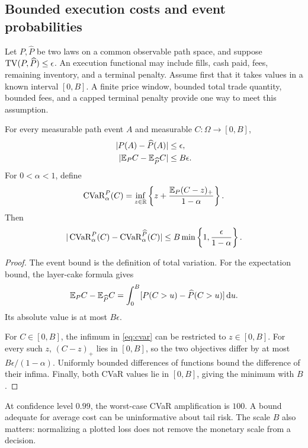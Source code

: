 \subsection{Bounded execution costs and event probabilities}
Let $P,\widehat P$ be two laws on a common observable path space, and suppose $\operatorname{TV}(P,\widehat P)\le\epsilon$. An execution functional may include fills, cash paid, fees, remaining inventory, and a terminal penalty. Assume first that it takes values in a known interval $[0,B]$. A finite price window, bounded total trade quantity, bounded fees, and a capped terminal penalty provide one way to meet this assumption.

\begin{theorem}\label{thm:risk}
For every measurable path event $A$ and measurable $C:\Omega\to[0,B]$,
\begin{align}
 |P(A)-\widehat P(A)|&\le\epsilon,\label{eq:event-bound}\\
 |\mathbb E_PC-\mathbb E_{\widehat P}C|&\le B\epsilon.\label{eq:cost-bound}
\end{align}
For $0<\alpha<1$, define
\begin{equation}\label{eq:cvar}
 \operatorname{CVaR}_\alpha^P(C)
 =\inf_{z\in\mathbb R}\left\{z+\frac{\mathbb E_P(C-z)_+}{1-\alpha}\right\}.
\end{equation}
Then
\begin{equation}\label{eq:cvar-bound}
 |\operatorname{CVaR}_\alpha^P(C)-\operatorname{CVaR}_\alpha^{\widehat P}(C)|
 \le B\min\left\{1,\frac{\epsilon}{1-\alpha}\right\}.
\end{equation}
\end{theorem}
\begin{proof}
The event bound is the definition of total variation. For the expectation bound, the layer-cake formula gives
\[
 \mathbb E_PC-\mathbb E_{\widehat P}C
 =\int_0^B[P(C>u)-\widehat P(C>u)]\,\mathrm d u.
\]
Its absolute value is at most $B\epsilon$.

For $C\in[0,B]$, the infimum in \eqref{eq:cvar} can be restricted to $z\in[0,B]$. For every such $z$, $(C-z)_+$ lies in $[0,B]$, so the two objectives differ by at most $B\epsilon/(1-\alpha)$. Uniformly bounded differences of functions bound the difference of their infima. Finally, both CVaR values lie in $[0,B]$, giving the minimum with $B$.
\end{proof}

At confidence level $0.99$, the worst-case CVaR amplification is $100$. A bound adequate for average cost can be uninformative about tail risk. The scale $B$ also matters: normalizing a plotted loss does not remove the monetary scale from a decision.

